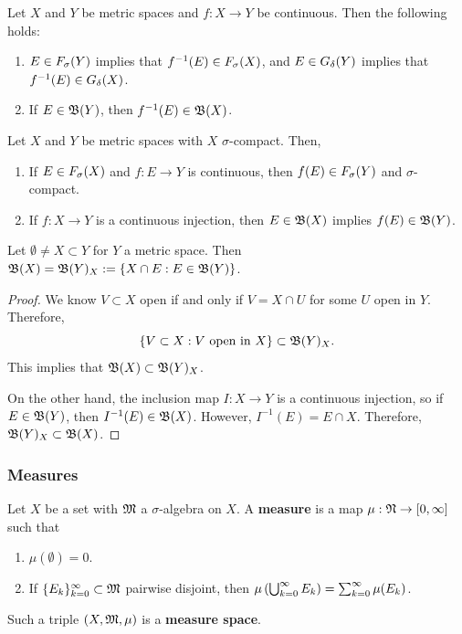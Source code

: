\documentclass[a4paper]{article}
\begin{document}
\begin{thm}
  Let $X$ and $Y$ be metric spaces and $f: X \to Y$ be 
  continuous. Then the following holds: 
  \begin{enumerate}
    \item $E \in F_\sigma(Y)$ implies that $f^{-1}(E) \in F_\sigma(X)$, 
    and $E \in G_\delta(Y)$ implies that $f^{-1}(E) \in G_\delta(X)$.

    \item If $E \in \mathfrak{B}(Y)$, then $f^{-1}(E) \in \mathfrak{B}(X)$.
  \end{enumerate}
\end{thm}

\begin{thm}
  Let $X$ and $Y$ be metric spaces with $X$ $\sigma$-compact.
  Then, 
  \begin{enumerate}
    \item If $E \in F_\sigma(X)$ and $f : E \to Y$ is continuous, 
    then $f(E) \in F_\sigma(Y)$ and $\sigma$-compact.

    \item If $f: X \to Y$ is a continuous injection, 
    then $E \in \mathfrak{B}(X)$ implies $f(E) \in \mathfrak{B}(Y)$.
  \end{enumerate}
\end{thm}

\begin{cor}
  Let $\emptyset \neq X \subset Y$ for $Y$ a metric space.
  Then $\mathfrak{B}(X) = \mathfrak{B}(Y)_X := \left\{ X \cap E: E \in 
  \mathfrak{B}(Y) \right\}$. 
\end{cor}

\begin{proof}
  We know $V \subset X$ open if and only if $V = X \cap U$
  for some $U$ open in $Y$. 
  Therefore, 
  \[
    \left\{ V \subset X: \text{$V$ open in $X$} 
    \right\} \subset \mathfrak{B}(Y)_X.
  \]
  This implies that $\mathfrak{B}(X) \subset \mathfrak{B}(Y)_X$.

  On the other hand, the inclusion map $I: X \to Y$ is 
  a continuous injection, so if $E \in \mathfrak{B}(Y)$, then 
  $I^{-1}(E) \in \mathfrak{B}(X)$. However, $I^{-1}(E) = E \cap X$.
  Therefore, $\mathfrak{B}(Y)_X \subset \mathfrak{B}(X)$.

\end{proof}

\subsubsection{Measures}

\begin{defi}[Measure]
  Let $X$ be a set with $\mathfrak{M}$ a $\sigma$-algebra on $X$. 
  A \textbf{measure} is a map $\mu: \mathfrak{N} \to [0, \infty]$
  such that 
  \begin{enumerate}
    \item $\mu(\emptyset) = 0$.
    \item If $\{ E_k \}_{k=0}^\infty \subset \mathfrak{M}$ pairwise disjoint,
    then $\mu \left( \bigcup_{k=0}^\infty E_k \right) = \sum_{k=0}^\infty \mu (E_k)$.
  \end{enumerate}
  Such a triple $(X, \mathfrak{M}, \mu)$ is a \textbf{measure 
  space}.
\end{defi}
\end{document}

